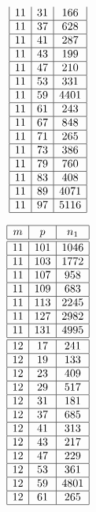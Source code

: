 \documentclass[a4paper, 10pt]{article}
\begin{document}
\begin{center}
\begin{minipage}[t]{.23\textwidth}
\begin{displaymath}
\begin{array}{|c|c|c|}
11 & 31 & 166 \\ \hline
11 & 37 & 628 \\ \hline
11 & 41 & 287 \\ \hline
11 & 43 & 199 \\ \hline
11 & 47 & 210 \\ \hline
11 & 53 & 331 \\ \hline
11 & 59 & 4401 \\ \hline
11 & 61 & 243 \\ \hline
11 & 67 & 848 \\ \hline
11 & 71 & 265 \\ \hline
11 & 73 & 386 \\ \hline
11 & 79 & 760 \\ \hline
11 & 83 & 408 \\ \hline
11 & 89 & 4071 \\ \hline
11 & 97 & 5116 \\ \hline
\end{array}
\end{displaymath}
\end{minipage}
\begin{minipage}[t]{.23\textwidth}
\begin{displaymath}
\begin{array}{|c|c|c|}
\hline
m & p & n_{1} \\ \hline
\hline
11 & 101 & 1046 \\ \hline
11 & 103 & 1772 \\ \hline
11 & 107 & 958 \\ \hline
11 & 109 & 683 \\ \hline
11 & 113 & 2245 \\ \hline
11 & 127 & 2982 \\ \hline
11 & 131 & 4995 \\ \hline
\hline
12 & 17 & 241 \\ \hline
12 & 19 & 133 \\ \hline
12 & 23 & 409 \\ \hline
12 & 29 & 517 \\ \hline
12 & 31 & 181 \\ \hline
12 & 37 & 685 \\ \hline
12 & 41 & 313 \\ \hline
12 & 43 & 217 \\ \hline
12 & 47 & 229 \\ \hline
12 & 53 & 361 \\ \hline
12 & 59 & 4801 \\ \hline
12 & 61 & 265 \\ \hline

\end{array}
\end{displaymath}
\end{minipage}
\end{center}
\end{document}
